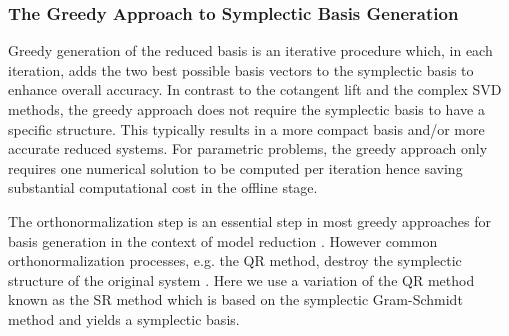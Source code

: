 \subsubsection{The Greedy Approach to Symplectic Basis Generation} \label{Chap:Symo.PrSy:3} Greedy generation of the reduced basis is an iterative procedure which, in each iteration, adds the two best possible basis vectors to the symplectic basis to enhance overall accuracy. In contrast to the cotangent lift and the complex SVD methods, the greedy approach does not require the symplectic basis to have a specific structure. This typically results in a more compact basis and/or more accurate reduced systems. For parametric problems, the greedy approach only requires one numerical solution to be computed per iteration hence saving substantial computational cost in the offline stage. 

{\edit The orthonormalization step is an essential step in most greedy approaches for basis generation in the context of model reduction \cite{Anonymous:2016wl,Quarteroni:2016wi}. However common orthonormalization processes, e.g. the QR method, destroy the symplectic structure of the original system \cite{BunseGerstner:1986dg}. Here we use a variation of the QR method known as the SR \cite{Salam2014} method which is based on the symplectic Gram-Schmidt method and yields a symplectic basis. 
}

